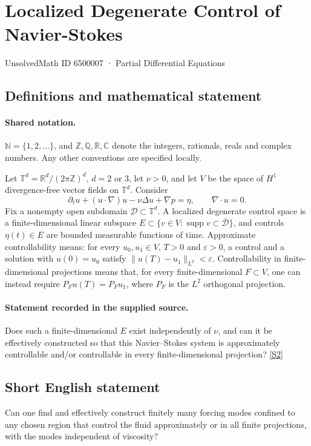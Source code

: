 \documentclass[11pt]{article}
\newcommand{\sref}[2]{\hyperlink{source:#1:#2}{[S#2]}}
\begin{document}
\setcounter{section}{6500006}
\section{Localized Degenerate Control of Navier-Stokes}\label{6500007}
{\small\sffamily UnsolvedMath ID 6500007 · Partial Differential Equations}
\subsection{Definitions and mathematical statement}

\paragraph{Shared notation.}$\mathbb N=\{1,2,\ldots\}$, and $\mathbb Z,\mathbb Q,\mathbb R,\mathbb C$ denote the integers, rationals, reals and complex numbers. Any other conventions are specified locally.


Let $\mathbb T^d=\mathbb R^d/(2\pi\mathbb Z)^d$, $d=2$ or $3$, let $\nu>0$, and let $V$ be the space of $H^1$ divergence-free vector fields on $\mathbb T^d$. Consider
\[\partial_tu+(u\cdot\nabla)u-\nu\Delta u+\nabla p=\eta,\qquad\nabla\cdot u=0.\]
Fix a nonempty open subdomain $\mathcal D\subset\mathbb T^d$. A localized degenerate control space is a finite-dimensional linear subspace $E\subset\{v\in V:\operatorname{supp}v\subset\overline{\mathcal D}\}$, and controls $\eta(t)\in E$ are bounded measurable functions of time. Approximate controllability means: for every $u_0,u_1\in V$, $T>0$ and $\varepsilon>0$, a control and a solution with $u(0)=u_0$ satisfy $\|u(T)-u_1\|_{L^2}<\varepsilon$. Controllability in finite-dimensional projections means that, for every finite-dimensional $F\subset V$, one can instead require $P_Fu(T)=P_Fu_1$, where $P_F$ is the $L^2$ orthogonal projection.
\paragraph{Statement recorded in the supplied source.}
Does such a finite-dimensional $E$ exist independently of $\nu$, and can it be effectively constructed so that this Navier--Stokes system is approximately controllable and/or controllable in every finite-dimensional projection? \sref{6500007}{2}
\subsection{Short English statement}
Can one find and effectively construct finitely many forcing modes confined to any chosen region that control the fluid approximately or in all finite projections, with the modes independent of viscosity?
\end{document}

